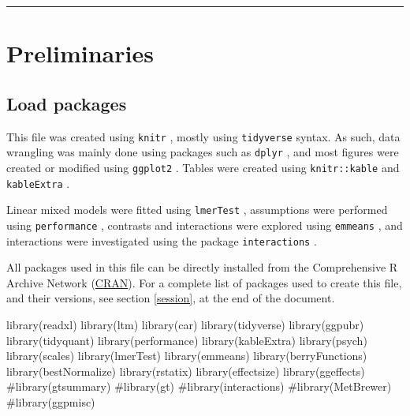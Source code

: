 \documentclass[
  bookmarksnumbered]{article}
\newenvironment{Shaded}{\begin{snugshade}}{\end{snugshade}}
\newcommand{\CommentTok}[1]{\textcolor[rgb]{0.50,0.62,0.50}{#1}}
\newcommand{\FunctionTok}[1]{\textcolor[rgb]{0.94,0.94,0.56}{#1}}
\newcommand{\NormalTok}[1]{\textcolor[rgb]{0.80,0.80,0.80}{#1}}
\begin{document}
\par
\endgroup

{\hypersetup{hidelinks}
\setcounter{tocdepth}{6}
\tableofcontents
}
\opensupplement

\begin{center}\rule{0.5\linewidth}{0.5pt}\end{center}

\section{Preliminaries}\label{preliminaries}

\subsection{Load packages}\label{load-packages}

This file was created using \texttt{knitr} \autocite{knitrcit}, mostly using \texttt{tidyverse} \autocite{tidyversecit} syntax. As such, data wrangling was mainly done using packages such as \texttt{dplyr} \autocite{dplyrcit}, and most figures were created or modified using \texttt{ggplot2} \autocite{ggplotcit}. Tables were created using \texttt{knitr::kable} and \texttt{kableExtra} \autocite{kableExtracit}.

Linear mixed models were fitted using \texttt{lmerTest} \autocite{lmertestcit}, assumptions were performed using \texttt{performance} \autocite{ludecke2021}, contrasts and interactions were explored using \texttt{emmeans} \autocite{emmeanscit}, and interactions were investigated using the package \texttt{interactions} \autocite{interactionscit}.

All packages used in this file can be directly installed from the Comprehensive R Archive Network (\href{https://cran.r-project.org/}{CRAN}). For a complete list of packages used to create this file, and their versions, see section \ref{session}, at the end of the document.

\begin{Shaded}
\begin{Highlighting}[]
\FunctionTok{library}\NormalTok{(readxl)}
\FunctionTok{library}\NormalTok{(ltm)}
\FunctionTok{library}\NormalTok{(car)}
\FunctionTok{library}\NormalTok{(tidyverse)}
\FunctionTok{library}\NormalTok{(ggpubr)}
\FunctionTok{library}\NormalTok{(tidyquant)}
\FunctionTok{library}\NormalTok{(performance)}
\FunctionTok{library}\NormalTok{(kableExtra)}
\FunctionTok{library}\NormalTok{(psych)}
\FunctionTok{library}\NormalTok{(scales)}
\FunctionTok{library}\NormalTok{(lmerTest)}
\FunctionTok{library}\NormalTok{(emmeans)}
\FunctionTok{library}\NormalTok{(berryFunctions)}
\FunctionTok{library}\NormalTok{(bestNormalize)}
\FunctionTok{library}\NormalTok{(rstatix)}
\FunctionTok{library}\NormalTok{(effectsize)}
\FunctionTok{library}\NormalTok{(ggeffects)}
\CommentTok{\#library(gtsummary)}
\CommentTok{\#library(gt)}
\CommentTok{\#library(interactions)}
\CommentTok{\#library(MetBrewer)}
\CommentTok{\#library(ggpmisc)}
\end{Highlighting}
\end{Shaded}
\end{document}
